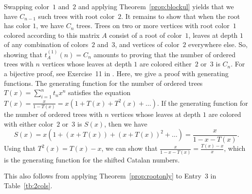 \documentclass[12pt]{amsart}
\begin{document}
\begin{description}
\begin{itemize}
\end{itemize}
    \item[Discussion] 
    Swapping color~$1$ and~$2$ and applying Theorem~\ref{prop:blockul} yields that we have $C_{n-1}$ such trees with root color~$2$.
    It remains to show that when the root has color $1$, we have $C_{n}$ trees. 
    Trees on two or more vertices with root color~$1$ colored according to this matrix $A$ consist of a root of color~$1$, leaves at depth $1$ of any combination of colors~$2$ and~$3$, and vertices of color~$2$ everywhere else. So, showing that $t_A^{(1)}(n)=C_n$ amounts to proving that the number of ordered trees with $n$ vertices whose leaves at depth $1$ are colored either~$2$ or~$3$ is $C_{n}$. For a bijective proof, see Exercise~11 in \cite{stanley2015catalan}. Here, we give a proof with generating functions. The generating function for the number of ordered trees $T(x) = \sum\limits_{i=1}^{n}t_{n}x^{n}$ satisfies the equation $T(x) = \frac{x}{1-T(x)} = x(1+T(x)+T^{2}(x)+ \ldots )$. If the generating function for the number of ordered trees with $n$ vertices whose leaves at depth $1$ are colored with either color~$2$ or~$3$ is $S(x)$, then we have
\[
S(x) = x(1 + (x+T(x))+ (x+T(x))^{2} + \ldots) = \frac{x}{1-x-T(x)}. 
\]
Using that $T^{2}(x) = T(x)-x$, we can show that $\frac{x}{1-x-T(x)} = \frac{T(x)-x}{x}$,  which is the generating function for the shifted Catalan numbers.

This also follows from applying Theorem~\ref{prop:rootonly} to Entry~3 in Table~\ref{tb:2cols}.
\end{description}
\end{document}
